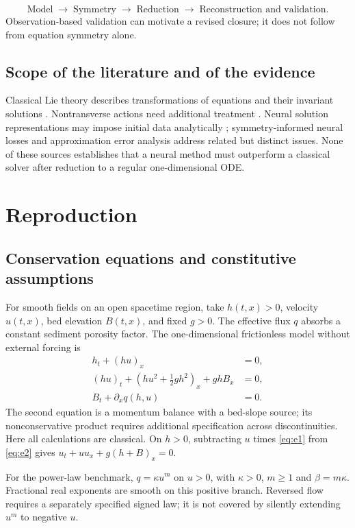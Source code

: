\documentclass[11pt,a4paper,oneside]{report}
\numberwithin{equation}{chapter}
\begin{document}
\begin{equation*}
\text{Model}\;\longrightarrow\;\text{Symmetry}\;\longrightarrow\;\text{Reduction}
\;\longrightarrow\;\text{Reconstruction and validation}.
\end{equation*}
Observation-based validation can motivate a revised closure; it does not follow from equation symmetry alone.


\section{Scope of the literature and of the evidence}
Classical Lie theory describes transformations of equations and their invariant solutions \cite{olver,oliveri2026}. Nontransverse actions need additional treatment \cite{anderson2000}. Neural solution representations may impose initial data analytically \cite{lagaris}; symmetry-informed neural losses \cite{sympinn} and approximation error analysis \cite{mishra2023} address related but distinct issues. None of these sources establishes that a neural method must outperform a classical solver after reduction to a regular one-dimensional ODE.

\chapter{Reproduction}\label{ch:models}\label{ch:reduction}
\section{Conservation equations and constitutive assumptions}
For smooth fields on an open spacetime region, take $h(t,x)>0$, velocity $u(t,x)$, bed elevation $B(t,x)$, and fixed $g>0$. The effective flux $q$ absorbs a constant sediment porosity factor. The one-dimensional frictionless model without external forcing is
\begin{align}
h_t+(hu)_x&=0,\label{eq:e1}\\
(hu)_t+(hu^2+\tfrac12gh^2)_x+ghB_x&=0,\label{eq:e2}\\
B_t+\partial_xq(h,u)&=0.\label{eq:e3}
\end{align}
The second equation is a momentum balance with a bed-slope source; its nonconservative product requires additional specification across discontinuities. Here all calculations are classical. On $h>0$, subtracting $u$ times \eqref{eq:e1} from \eqref{eq:e2} gives $u_t+uu_x+g(h+B)_x=0$.

For the power-law benchmark, $q=\kappa u^m$ on $u>0$, with $\kappa>0$, $m\ge1$ and $\beta=m\kappa$. Fractional real exponents are smooth on this positive branch. Reversed flow requires a separately specified signed law; it is not covered by silently extending $u^m$ to negative $u$.
\end{document}
